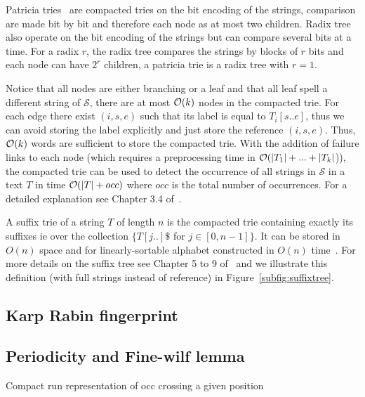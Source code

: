 Patricia tries~\cite{morrison1968patricia} are compacted tries on the bit encoding of the strings, comparison are made bit by bit and therefore each node as at most two children. Radix tree also operate on the bit encoding of the strings but can compare several bits at a time. For a radix $r$, the radix tree compares the strings by blocks of $r$ bits and each node can have $2^r$ children, a patricia trie is a radix tree with $r=1$.

Notice that all nodes are either branching or a leaf and that all leaf spell a different string of $\mathcal{S}$, there are at most $\mathcal{O}(k)$ nodes in the compacted trie.
For each edge there exist $(i,s,e)$ such that its label is equal to $T_i[s .. e]$, thus we can avoid storing the label explicitly and just store the reference $(i,s,e)$.
Thus, $\mathcal{O}(k)$ words are sufficient to store the compacted trie.
%
With the addition of failure links to each node (which requires a preprocessing time in $\mathcal{O}(|T_1| + ... +|T_k|$)), the compacted trie can be used to detect the occurrence of all strings in $\mathcal{S}$ in a text $T$ in time $\mathcal{O}(|T|+occ)$ where $occ$ is the total number of occurrences. For a detailed explanation see Chapter 3.4 of~\cite{Gusfield1997}. 


A suffix trie of a string $T$ of length $n$ is the compacted trie containing exactly its suffixes ie over the collection $\{T[j..]\$$ for $ j \in [0,n-1] \}$. It can be stored in $O(n)$ space and for linearly-sortable alphabet constructed in $O(n)$ time~\cite{Farach1997}. For more details on the suffix tree see Chapter 5 to 9 of~\cite{Gusfield1997} and we illustrate this definition (with full strings instead of reference) in Figure~\ref{subfig:suffixtree}.




\subsection{Karp Rabin fingerprint}

\subsection{Periodicity and Fine-wilf lemma}
Compact run representation of occ crossing a given position

